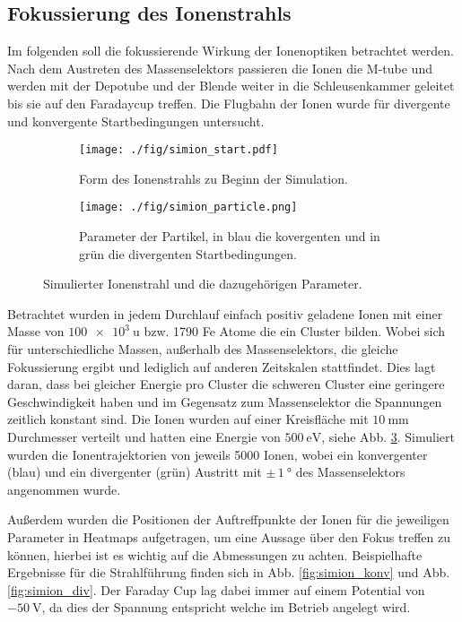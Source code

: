 \subsection{Fokussierung des Ionenstrahls}
\label{sec:fokus1}
Im folgenden soll die fokussierende Wirkung der Ionenoptiken betrachtet werden.
Nach dem Austreten des Massenselektors passieren die Ionen die M-tube und werden mit der Depotube und der Blende weiter in die Schleusenkammer geleitet bis sie auf den Faradaycup treffen.
Die Flugbahn der Ionen wurde für divergente und konvergente Startbedingungen untersucht.
\begin{figure}
  \centering
  \begin{subfigure}[h]{0.5\textwidth}
    \texttt{[image: ./fig/simion\_start.pdf]}
    \caption{Form des Ionenstrahls zu Beginn der Simulation.}
    \label{fig:strahlform}
  \end{subfigure}\hfill
  \begin{subfigure}[h]{0.475\textwidth}
    \texttt{[image: ./fig/simion\_particle.png]}
    \caption{Parameter der Partikel, in blau die kovergenten und in grün die divergenten Startbedingungen.}
    \label{fig:strahlparameter}
  \end{subfigure}
  \caption{Simulierter Ionenstrahl und die dazugehörigen Parameter.}
  \label{fig:simion_start}
\end{figure}
Betrachtet wurden in jedem Durchlauf einfach positiv geladene Ionen mit einer Masse von $\SI{100e3}{\amu}$ bzw. 1790 Fe Atome die ein Cluster bilden.
Wobei sich für unterschiedliche Massen, außerhalb des Massenselektors, die gleiche Fokussierung ergibt
und lediglich auf anderen Zeitskalen stattfindet.
Dies lagt daran, dass bei gleicher Energie pro Cluster die schweren Cluster eine geringere Geschwindigkeit haben und im Gegensatz zum Massenselektor die Spannungen zeitlich konstant sind.
Die Ionen wurden auf einer Kreisfläche mit $\SI{10}{\mm}$ Durchmesser verteilt und hatten eine Energie von $\SI{500}{\eV}$, siehe Abb. \ref{fig:simion_start}.
Simuliert wurden die Ionentrajektorien von jeweils 5000 Ionen, wobei ein konvergenter (blau) und ein divergenter (grün) Austritt mit $\pm\,\SI{1}{\degree}$ des Massenselektors angenommen wurde.




Außerdem wurden die Positionen der Auftreffpunkte der Ionen für die jeweiligen Parameter in Heatmaps aufgetragen, um eine Aussage über den Fokus treffen zu können, hierbei ist es wichtig auf die Abmessungen zu achten.
Beispielhafte Ergebnisse für die Strahlführung finden sich in Abb. \ref{fig:simion_konv} und Abb. \ref{fig:simion_div}.
Der Faraday Cup lag dabei immer auf einem Potential von $\SI{-50}{\volt}$, da dies der Spannung entspricht welche im Betrieb angelegt wird.\\

